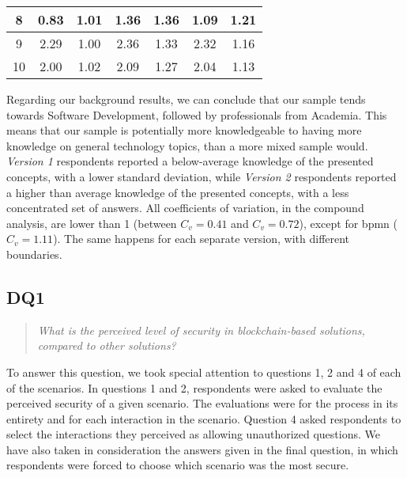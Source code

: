 \begin{table}[htb]
\begin{tabular}{c|cc|cc|cc}
		\hline
		8           & 0.83                              & 1.01                                     & 1.36                         & 1.36         & 1.09        & 1.21         \\
		\hline
		9           & 2.29                              & 1.00                                     & 2.36                         & 1.33         & 2.32        & 1.16         \\
		\hline
		10          & 2.00                              & 1.02                                     & 2.09                         & 1.27         & 2.04        & 1.13         \\
		\hline
	\end{tabular}
\end{table}

Regarding our background results, we can conclude that our sample tends towards Software Development, followed by professionals from Academia. This means that our sample is potentially more knowledgeable to having more knowledge on general technology topics, than a more mixed sample would. \textit{Version 1} respondents reported a below-average knowledge of the presented concepts, with a lower standard deviation, while \textit{Version 2} respondents reported a higher than average knowledge of the presented concepts, with a less concentrated set of answers. All coefficients of variation, in the compound analysis, are lower than 1 (between $C_v = 0.41$ and $C_v = 0.72$), except for \gls{bpmn} ($C_v = 1.11$). The same happens for each separate version, with different boundaries.

\subsection{DQ1}

\begin{quote}
	\textit{What is the perceived level of security in blockchain-based solutions, compared to other solutions?}
\end{quote}

To answer this question, we took special attention to questions 1, 2 and 4 of each of the scenarios. In questions 1 and 2, respondents were asked to evaluate the perceived security of a given scenario. The evaluations were for the process in its entirety and for each interaction in the scenario. Question 4 asked respondents to select the interactions they perceived as allowing unauthorized questions. We have also taken in consideration the answers given in the final question, in which respondents were forced to choose which scenario was the most secure.

